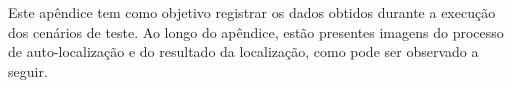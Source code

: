 
Este apêndice tem como objetivo registrar os dados obtidos durante a execução dos cenários de teste. Ao longo do apêndice, estão presentes
imagens do processo de auto-localização e do resultado da localização, como pode ser observado a seguir.











